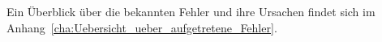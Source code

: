 Ein Überblick über die bekannten Fehler und ihre Ursachen findet sich im Anhang~\ref{cha:Uebersicht_ueber_aufgetretene_Fehler}.








\begin{comment}
\begin{itemize}
 \item konstruktive Fehler
 \begin{itemize}
    \item Kleber für Messlineal ist nicht für die ölhaltige Umgebung und Temperaturen vorgesehen
    \item Der konstruktive Fehler, dass Schmieröl in den Motor und anschließend in den Motorgeber gelangen kann, wurde bereits durch konstruktive Maßnahmen beseitigt. Allerdings sind noch einige Achsen mit dieser Schwachstelle im Umlauf. So ist in der nächsten Zeit mit weiteren Reklamationen aufgrund dieser Ursache zu rechnen.
 \end{itemize}
 
 
 
 
 
 \item Fertigungsfehler der Einzelkomponenten
 \begin{itemize}
    \item Immer wieder müssen nicht zeichnungsgemäß gefertigte Bauteile nachgearbeitet oder ausgetauscht werden. Dies führt zu erheblichen Verzögerungen während der Montage.
 \end{itemize}
 
 
 
 \item Fehler bei der Montage 
 \begin{itemize}
    \item Durch Fehler bei der Montage ergibt sich axiales Spiel, insbesondere durch nicht richtiges Anziehen der Spannmutter in der Pinole. Durch abändern der Montage Reihenfolge kann das falsche Anziehen der Spannmutter verhindert werden. Durch falsches Abstimmen der Abstimmscheibe kann es allerdings immer noch zu axialem Spiel kommen.
    \item Durch nicht richtig abgestimmte Abstimmscheiben kann es entweder zu axialem Spiel oder einer zu großen Vorspannung der Lager kommen.
 \end{itemize}
 
 
 
 
 \item fehlerhafte Programmierung
 \begin{itemize}
    \item Falsch programmierte Parameter treten immer wieder auf, da beim Einrichten eines neuen Werkzeuges alle Parameter für das Aggregat manuell eingegeben werden müssen. Dies führt immer wieder zu unerwarteten Fehlern und längeren Fehlersuchen.
 \end{itemize}
 

\end{comment}
